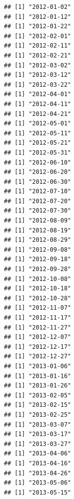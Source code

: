 \documentclass[
]{book}
\begin{document}
\begin{verbatim}
## [1] "2012-01-02"
## [1] "2012-01-12"
## [1] "2012-01-22"
## [1] "2012-02-01"
## [1] "2012-02-11"
## [1] "2012-02-21"
## [1] "2012-03-02"
## [1] "2012-03-12"
## [1] "2012-03-22"
## [1] "2012-04-01"
## [1] "2012-04-11"
## [1] "2012-04-21"
## [1] "2012-05-01"
## [1] "2012-05-11"
## [1] "2012-05-21"
## [1] "2012-05-31"
## [1] "2012-06-10"
## [1] "2012-06-20"
## [1] "2012-06-30"
## [1] "2012-07-10"
## [1] "2012-07-20"
## [1] "2012-07-30"
## [1] "2012-08-09"
## [1] "2012-08-19"
## [1] "2012-08-29"
## [1] "2012-09-08"
## [1] "2012-09-18"
## [1] "2012-09-28"
## [1] "2012-10-08"
## [1] "2012-10-18"
## [1] "2012-10-28"
## [1] "2012-11-07"
## [1] "2012-11-17"
## [1] "2012-11-27"
## [1] "2012-12-07"
## [1] "2012-12-17"
## [1] "2012-12-27"
## [1] "2013-01-06"
## [1] "2013-01-16"
## [1] "2013-01-26"
## [1] "2013-02-05"
## [1] "2013-02-15"
## [1] "2013-02-25"
## [1] "2013-03-07"
## [1] "2013-03-17"
## [1] "2013-03-27"
## [1] "2013-04-06"
## [1] "2013-04-16"
## [1] "2013-04-26"
## [1] "2013-05-06"
## [1] "2013-05-15"
\end{verbatim}
\end{document}
